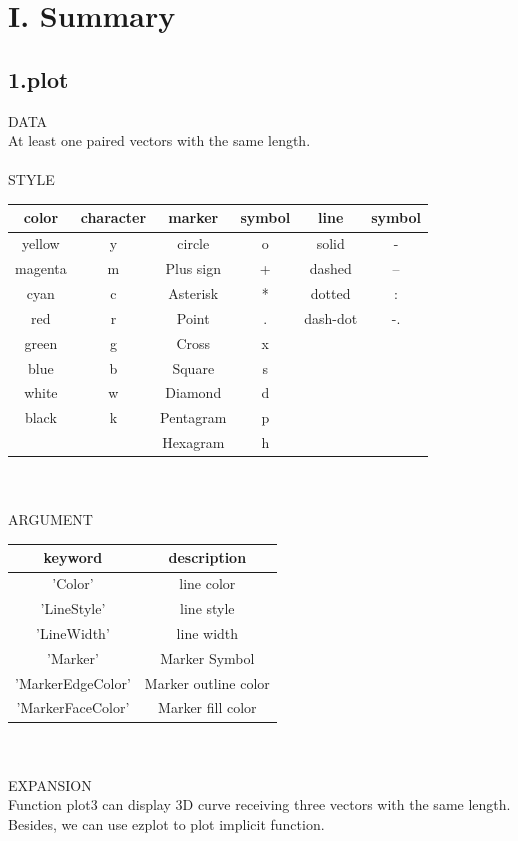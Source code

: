 \documentclass[twoside,a4paper]{article}
\begin{document}
\pagestyle{fancy}
\fancyhead{}
\section*{I. Summary}

\subsection*{1.plot}

\Large{DATA} \\
At least one paired vectors with the same length.\\
\\
\Large{STYLE}\\

\begin{tabular}{cc|cc|cc}
\hline
color & character & marker & symbol& line & symbol  \\
\hline
yellow & y & circle & o & solid & -\\
magenta & m & Plus sign & + & dashed & --\\
cyan & c & Asterisk & * & dotted & :\\
red & r & Point & . & dash-dot & -.\\
green & g & Cross & x\\ 
blue & b & Square & s\\ 
white & w & Diamond & d\\
black & k & Pentagram & p\\
 &  & Hexagram & h\\
\end{tabular}
\\
\\
\Large{ARGUMENT}\\

\begin{tabular}{|c|c|}
\hline
keyword & description \\
\hline
'Color' & line color\\
'LineStyle' & line style \\
'LineWidth' & line width \\
'Marker' & Marker Symbol \\
'MarkerEdgeColor' & Marker outline color\\
'MarkerFaceColor' & Marker fill color\\
\hline
\end{tabular}\\
\vbox{}\vbox{}\vbox{}\\
\Large{EXPANSION}\\
Function plot3 can display 3D curve receiving three vectors with the same length. Besides, we can use ezplot to plot implicit function.
\end{document}
